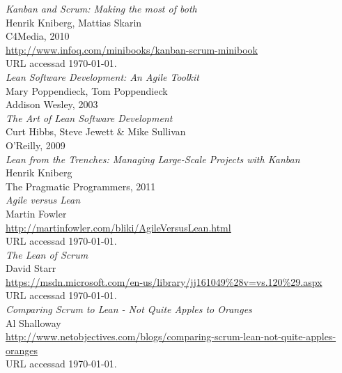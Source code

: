 \documentclass[a4paper,11pt,oneside]{report}
\begin{document}
\begin{thebibliography}{9}
  \emph{Kanban and Scrum: Making the most of both}\\
  \newblock Henrik Kniberg, Mattias Skarin\\
  \newblock C4Media, 2010\\
  \newblock \url{http://www.infoq.com/minibooks/kanban-scrum-minibook}\\
  \newblock URL accessad \today.\\

  \emph{Lean Software Development: An Agile Toolkit}\\
  \newblock Mary Poppendieck, Tom Poppendieck\\
  \newblock Addison Wesley, 2003\\

 \emph{The Art of Lean Software Development}\\
  \newblock Curt Hibbs, Steve Jewett \& Mike Sullivan\\
  \newblock O'Reilly, 2009\\

 \emph{Lean from the Trenches: Managing
    Large-Scale Projects with Kanban}\\
  \newblock Henrik Kniberg\\
  \newblock The Pragmatic Programmers, 2011\\

 \emph{Agile versus Lean}\\
  \newblock Martin Fowler\\
  \newblock \url{http://martinfowler.com/bliki/AgileVersusLean.html}\\
  \newblock URL accessad \today.\\

 \emph{The Lean of Scrum}\\
  \newblock David Starr\\
  \newblock
    \url{https://msdn.microsoft.com/en-us/library/jj161049%28v=vs.120%29.aspx}\\
  \newblock URL accessad \today.\\

  \emph{Comparing Scrum to Lean - Not Quite Apples to Oranges}\\
  \newblock Al Shalloway\\
  \newblock
  \url{http://www.netobjectives.com/blogs/comparing-scrum-lean-not-quite-apples-oranges}\\
  \newblock URL accessad \today.\\

\end{thebibliography}
\end{document}
